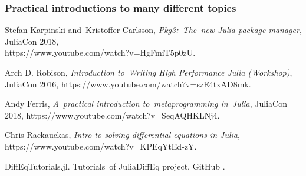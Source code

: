 \documentclass[10pt,t]{beamer}
\begin{document}
\begin{frame}
  \frametitle{Practical introductions to many different topics}


  Stefan Karpinski and~Kristoffer Carlsson,
  \textit{Pkg3:~The~new Julia package manager}, JuliaCon 2018, \\
  {https://www.youtube.com/watch?v=HgFmiT5p0zU}.

  \vspace{0.3em}



  Arch D. Robison, \textit{Introduction to~Writing High Performance
    Julia (Workshop)}, JuliaCon 2016,
  {https://www.youtube.com/watch?v=szE4txAD8mk}.

  \vspace{0.3em}



  Andy Ferris, \textit{A~practical introduction to~metaprogramming
    in~Julia}, JuliaCon 2018,
  {https://www.youtube.com/watch?v=SeqAQHKLNj4}.

  \vspace{0.3em}



  Chris Rackauckas, \textit{Intro to solving differential
    equations in Julia}, \\
  {https://www.youtube.com/watch?v=KPEqYtEd-zY}.

  \vspace{0.3em}



  DiffEqTutorials.jl. Tutorials~of JuliaDiffEq project, GitHub
  .

\end{frame}
\end{document}

